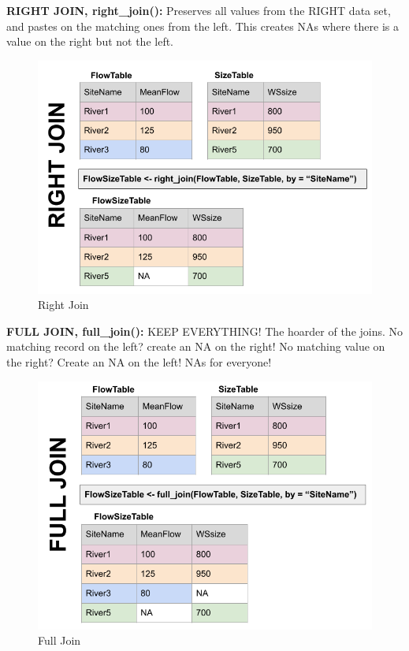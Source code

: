 \documentclass[
]{book}
\begin{document}
\textbf{RIGHT JOIN, right\_join():} Preserves all values from the RIGHT data set, and pastes on the matching ones from the left. This creates NAs where there is a value on the right but not the left.

\begin{figure}
\centering
\includegraphics{images/rightjoin.png}
\caption{Right Join}
\end{figure}

\textbf{FULL JOIN, full\_join():} KEEP EVERYTHING! The hoarder of the joins. No matching record on the left? create an NA on the right! No matching value on the right? Create an NA on the left! NAs for everyone!

\begin{figure}
\centering
\includegraphics{images/fulljoin.png}
\caption{Full Join}
\end{figure}
\end{document}
